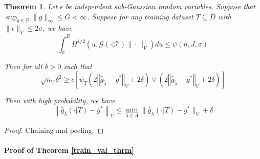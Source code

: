 \documentclass[12pt]{article}
\newtheorem{theorem}{Theorem}
\begin{document}
\begin{theorem}
\label{train_val_thrm_complicated}
Let $\epsilon$ be independent sub-Gaussian random variables. 
Suppose that $\sup_{g \in \mathcal{G}} \| g \|_\infty \le G < \infty$.
Suppose for any training dataset $T \subseteq D$ with $\| \epsilon \|_T \le 2 \sigma$, we have
\begin{equation}
\int_0^R H^{1/2} \left ( u, \mathcal{G(\cdot | T)} \| \cdot \|_V \right ) du \le \psi(n, J, \sigma)
\end{equation}

Then for all $\delta  > 0$ such that
\begin{equation}
\sqrt{n_{V}}\delta^{2}
\ge 
c \left[
\psi_{T}\left(2\left\Vert \hat{g}_{\tilde{\lambda}}-g^{*}\right\Vert _{V} + 2\delta\right)
\vee
\left(2\left\Vert \hat{g}_{\tilde{\lambda}}-g^{*}\right\Vert _{V}+2\delta\right)
\right]
\end{equation}

Then with high probability, we have
\begin{equation}
\label{error_bound}
\left \|\hat{g}_{\hat{\lambda} }(\cdot | T) - g^* \right \|_V
\le 
\min_{\lambda \in \Lambda}\| \hat{g}_{\lambda}(\cdot | T) - g^*\|_V
+ \delta
\end{equation}
\end{theorem}

\begin{proof}
Chaining and peeling.
\end{proof}

%

\paragraph{Proof of Theorem \ref{train_val_thrm}}
\end{document}
